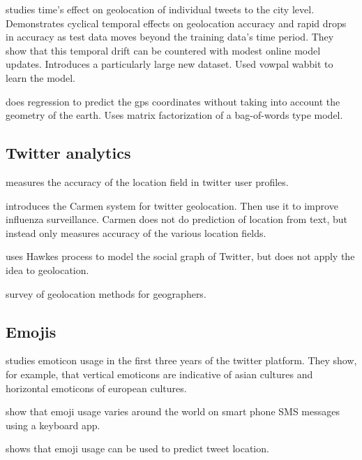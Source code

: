 \documentclass[sigconf,10pt]{acmart}
\begin{document}
\citet{dredze2016geolocation} studies time's effect on geolocation of individual tweets to the city level.
Demonstrates cyclical temporal effects on geolocation accuracy and rapid drops in accuracy as test data moves beyond the training data's time period.
They show that this temporal drift can be countered with modest online model updates.
Introduces a particularly large new dataset.
Used vowpal wabbit to learn the model.

\citet{duong2016near} does regression to predict the gps coordinates without taking into account the geometry of the earth.
Uses matrix factorization of a bag-of-words type model.


\subsection{Twitter analytics}

\citet{hecht2011tweets} measures the accuracy of the location field in twitter user profiles.

\citet{dredze2013carmen} introduces the Carmen system for twitter geolocation.
Then use it to improve influenza surveillance.
Carmen does not do prediction of location from text,
but instead only measures accuracy of the various location fields.

\citet{he2015hawkestopic} uses Hawkes process to model the social graph of Twitter,
but does not apply the idea to geolocation.

\citet{graham2014world} survey of geolocation methods for geographers.


\subsection{Emojis}

\citet{park2013emoticon} studies emoticon usage in the first three years of the twitter platform.
They show, for example, that vertical emoticons are indicative of asian cultures and horizontal emoticons of european cultures.

\citet{lu2016learning} show that emoji usage varies around the world on smart phone SMS messages using a keyboard app.

\citet{ljubevsic2016global} shows that emoji usage can be used to predict tweet location.

\end{document}
